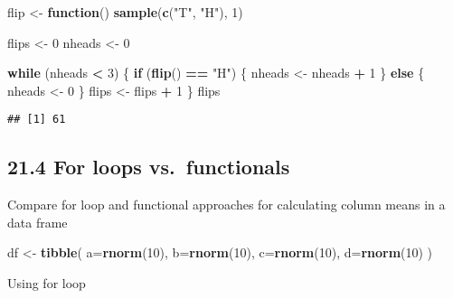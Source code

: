 \documentclass[
]{article}
\newenvironment{Shaded}{\begin{snugshade}}{\end{snugshade}}
\newcommand{\AttributeTok}[1]{\textcolor[rgb]{0.13,0.29,0.53}{#1}}
\newcommand{\ControlFlowTok}[1]{\textcolor[rgb]{0.13,0.29,0.53}{\textbf{#1}}}
\newcommand{\DecValTok}[1]{\textcolor[rgb]{0.00,0.00,0.81}{#1}}
\newcommand{\FunctionTok}[1]{\textcolor[rgb]{0.13,0.29,0.53}{\textbf{#1}}}
\newcommand{\NormalTok}[1]{#1}
\newcommand{\OtherTok}[1]{\textcolor[rgb]{0.56,0.35,0.01}{#1}}
\newcommand{\SpecialCharTok}[1]{\textcolor[rgb]{0.81,0.36,0.00}{\textbf{#1}}}
\newcommand{\StringTok}[1]{\textcolor[rgb]{0.31,0.60,0.02}{#1}}
\begin{document}
\begin{Shaded}
\begin{Highlighting}[]
\NormalTok{flip }\OtherTok{\textless{}{-}} \ControlFlowTok{function}\NormalTok{() }\FunctionTok{sample}\NormalTok{(}\FunctionTok{c}\NormalTok{(}\StringTok{"T"}\NormalTok{, }\StringTok{"H"}\NormalTok{), }\DecValTok{1}\NormalTok{)}

\NormalTok{flips }\OtherTok{\textless{}{-}} \DecValTok{0}
\NormalTok{nheads }\OtherTok{\textless{}{-}} \DecValTok{0}

\ControlFlowTok{while}\NormalTok{ (nheads }\SpecialCharTok{\textless{}} \DecValTok{3}\NormalTok{) \{}
  \ControlFlowTok{if}\NormalTok{ (}\FunctionTok{flip}\NormalTok{() }\SpecialCharTok{==} \StringTok{"H"}\NormalTok{) \{}
\NormalTok{    nheads }\OtherTok{\textless{}{-}}\NormalTok{ nheads }\SpecialCharTok{+} \DecValTok{1}
\NormalTok{  \} }\ControlFlowTok{else}\NormalTok{ \{}
\NormalTok{    nheads }\OtherTok{\textless{}{-}} \DecValTok{0}
\NormalTok{  \}}
\NormalTok{  flips }\OtherTok{\textless{}{-}}\NormalTok{ flips }\SpecialCharTok{+} \DecValTok{1}
\NormalTok{\}}
\NormalTok{flips}
\end{Highlighting}
\end{Shaded}

\begin{verbatim}
## [1] 61
\end{verbatim}

\hypertarget{for-loops-vs.-functionals}{%
\subsection{21.4 For loops
vs.~functionals}\label{for-loops-vs.-functionals}}

Compare for loop and functional approaches for calculating column means
in a data frame

\begin{Shaded}
\begin{Highlighting}[]
\NormalTok{df }\OtherTok{\textless{}{-}} \FunctionTok{tibble}\NormalTok{(}
  \AttributeTok{a=}\FunctionTok{rnorm}\NormalTok{(}\DecValTok{10}\NormalTok{),}
  \AttributeTok{b=}\FunctionTok{rnorm}\NormalTok{(}\DecValTok{10}\NormalTok{),}
  \AttributeTok{c=}\FunctionTok{rnorm}\NormalTok{(}\DecValTok{10}\NormalTok{),}
  \AttributeTok{d=}\FunctionTok{rnorm}\NormalTok{(}\DecValTok{10}\NormalTok{)}
\NormalTok{)}
\end{Highlighting}
\end{Shaded}

Using for loop
\end{document}
